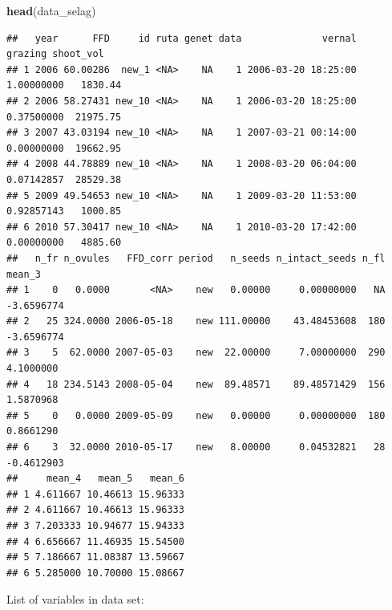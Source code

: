 \documentclass[
]{article}
\newenvironment{Shaded}{\begin{snugshade}}{\end{snugshade}}
\newcommand{\KeywordTok}[1]{\textcolor[rgb]{0.13,0.29,0.53}{\textbf{#1}}}
\newcommand{\NormalTok}[1]{#1}
\begin{document}
\begin{Shaded}
\begin{Highlighting}[]
\KeywordTok{head}\NormalTok{(data\_selag)}
\end{Highlighting}
\end{Shaded}

\begin{verbatim}
##   year      FFD     id ruta genet data              vernal    grazing shoot_vol
## 1 2006 60.00286  new_1 <NA>    NA    1 2006-03-20 18:25:00 1.00000000   1830.44
## 2 2006 58.27431 new_10 <NA>    NA    1 2006-03-20 18:25:00 0.37500000  21975.75
## 3 2007 43.03194 new_10 <NA>    NA    1 2007-03-21 00:14:00 0.00000000  19662.95
## 4 2008 44.78889 new_10 <NA>    NA    1 2008-03-20 06:04:00 0.07142857  28529.38
## 5 2009 49.54653 new_10 <NA>    NA    1 2009-03-20 11:53:00 0.92857143   1000.85
## 6 2010 57.30417 new_10 <NA>    NA    1 2010-03-20 17:42:00 0.00000000   4885.60
##   n_fr n_ovules   FFD_corr period   n_seeds n_intact_seeds n_fl     mean_3
## 1    0   0.0000       <NA>    new   0.00000     0.00000000   NA -3.6596774
## 2   25 324.0000 2006-05-18    new 111.00000    43.48453608  180 -3.6596774
## 3    5  62.0000 2007-05-03    new  22.00000     7.00000000  290  4.1000000
## 4   18 234.5143 2008-05-04    new  89.48571    89.48571429  156  1.5870968
## 5    0   0.0000 2009-05-09    new   0.00000     0.00000000  180  0.8661290
## 6    3  32.0000 2010-05-17    new   8.00000     0.04532821   28 -0.4612903
##     mean_4   mean_5   mean_6
## 1 4.611667 10.46613 15.96333
## 2 4.611667 10.46613 15.96333
## 3 7.203333 10.94677 15.94333
## 4 6.656667 11.46935 15.54500
## 5 7.186667 11.08387 13.59667
## 6 5.285000 10.70000 15.08667
\end{verbatim}

List of variables in data set:
\end{document}
